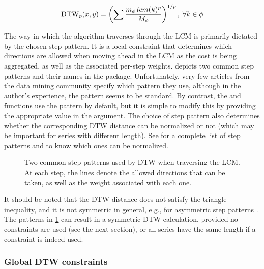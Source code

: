 \begin{equation}
\label{eq:dtwp}
\text{DTW}_p{}(x,y) = \left( \sum \frac{m_\phi \, lcm(k) ^ p}{M_\phi} \right) ^ {1/p}, \; \forall k \in \phi
\end{equation}

The way in which the algorithm traverses through the LCM is primarily dictated by the chosen step pattern.
It is a local constraint that determines which directions are allowed when moving ahead in the LCM as the cost is being aggregated,
as well as the associated per-step weights.
 depicts two common step patterns and their names in the  package.
Unfortunately, very few articles from the data mining community specify which pattern they use,
although in the author's experience,
the  pattern seems to be standard.
By contrast, the  and  functions use the  pattern by default,
but it is simple to modify this by providing the appropriate value in the  argument.
The choice of step pattern also determines whether the corresponding DTW distance can be normalized or not
(which may be important for series with different length).
See \citet{giorgino2009} for a complete list of step patterns and to know which ones can be normalized.

\begin{figure}[htbp]

{\centering {}

}

\caption{Two common step patterns used by DTW when traversing the LCM. At each step, the lines denote the allowed directions that can be taken, as well as the weight associated with each one.}\label{fig:step-patterns}
\end{figure}

It should be noted that the DTW distance does not satisfy the triangle inequality,
and it is not symmetric in general,
e.g., for asymmetric step patterns \citep{giorgino2009}.
The patterns in \cref{fig:step-patterns} can result in a symmetric DTW calculation,
provided no constraints are used (see the next section),
or all series have the same length if a constraint is indeed used.

\subsubsection{Global DTW constraints}
\label{sec:dtw-window}

